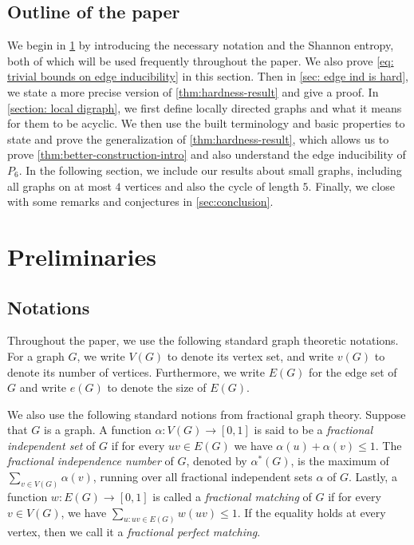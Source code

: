 \documentclass[reqno,11pt]{amsart}
\numberwithin{equation}{section}
\theoremstyle{definition}
\theoremstyle{remark}
\begin{document}
\subsection{Outline of the paper}
We begin in \cref{sec:prelim} by introducing the necessary notation and the Shannon entropy, both of which will be used frequently throughout the paper. We also prove \cref{eq: trivial bounds on edge inducibility} in this section.
Then in \cref{sec: edge ind is hard}, we state a more precise version of \cref{thm:hardness-result} and give a proof.
In \cref{section: local digraph}, we first define locally directed graphs and what it means for them to be acyclic.
We then use the built terminology and basic properties to state and prove the generalization of \cref{thm:hardness-result}, which allows us to prove \cref{thm:better-construction-intro} and also understand the edge inducibility of $P_6$.
In the following section, we include our results about small graphs, including all graphs on at most $4$ vertices and also the cycle of length $5$.
Finally, we close with some remarks and conjectures in \cref{sec:conclusion}.



\section{Preliminaries}\label{sec:prelim}
\subsection{Notations}
Throughout the paper, we use the following standard graph theoretic notations.  For a graph $G$, we write $V(G)$ to denote its vertex set, and write $v(G)$ to denote its number of vertices. Furthermore, we write $E(G)$ for the edge set of $G$ and write $e(G)$ to denote the size of $E(G)$. 

We also use the following standard notions from fractional graph theory. 
Suppose that $G$ is a graph. A function $\alpha\colon V(G)\to [0,1]$ is said to be a \emph{fractional independent set} of $G$ if for every $uv\in E(G)$ we have $\alpha(u)+\alpha(v)\le 1$.
The \emph{fractional independence number} of $G$, denoted by $\alpha^*(G)$, is the maximum of $\sum_{v\in V(G)}\alpha(v)$, running over all fractional independent sets $\alpha$ of $G$.
Lastly, a function $w\colon E(G)\to [0,1]$ is called a \emph{fractional matching} of $G$ if for every $v\in V(G)$, we have $\sum_{u:uv\in E(G)}w(uv)\leq 1$.
If the equality holds at every vertex, then we call it a \emph{fractional perfect matching}.
\end{document}
